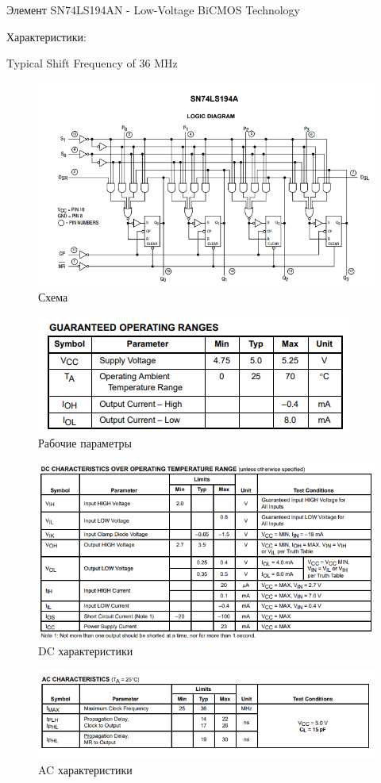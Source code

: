 Элемент SN74LS194AN - Low-Voltage BiCMOS Technology

Характеристики:

Typical Shift Frequency of 36 MHz

\begin{figure}[H]
	\centering
	\includegraphics[width=0.95\linewidth]{imgs/11/11_sh}
	\caption{Схема}
	\label{fig:11_sh}
\end{figure}

\begin{figure}[H]
	\centering
	\includegraphics[width=0.95\linewidth]{imgs/11/11_guar}
	\caption{Рабочие параметры}
	\label{fig:11_guar}
\end{figure}

\begin{figure}[H]
	\centering
	\includegraphics[width=0.95\linewidth]{imgs/11/11_dc}
	\caption{DC характеристики}
	\label{fig:11_dc}
\end{figure}

\begin{figure}[H]
	\centering
	\includegraphics[width=0.95\linewidth]{imgs/11/11_ac_ch}
	\caption{AC характеристики}
	\label{fig:11_ac_ch}
\end{figure}

